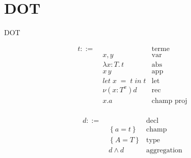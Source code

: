 \documentclass{beamer}
\newcommand{\lambdaExpr}[2]{\lambda #1 . \, #2}
\newcommand{\localLetBinding}[3]{let \; #1 \; = \; #2 \; in \; #3}
\begin{document}
%

\section{DOT}

\begin{frame}
	\begin{center}
		\Huge{DOT}
	\end{center}
\end{frame}

\begin{frame}
  \begin{minipage}{0.45\textwidth}
    \begin{align*}
      t ::= & \, & \text{terme} \\
            & \; x, y & \text{var} \\
            & \; \lambdaExpr{x : T}{t} & \text{abs} \\
            & \; x \, y & \text{app} \\
            & \; \localLetBinding{x}{t}{t} & \text{let} \\
            & \; \nu(x : T^{x})d & \text{rec} \\
            & \; x.a & \text{champ proj} \\
    \end{align*}
  \end{minipage}
  \begin{minipage}{0.45\textwidth}
    \begin{align*}
      d ::= & \, & \text{decl} \\
            & \; \left\{ a = t \right\} & \text{champ} \\
            & \; \left\{ A = T \right\} & \text{type} \\
            & \; d \wedge d & \text{aggregation}
    \end{align*}
  \end{minipage}
\end{frame} 
\end{document}
